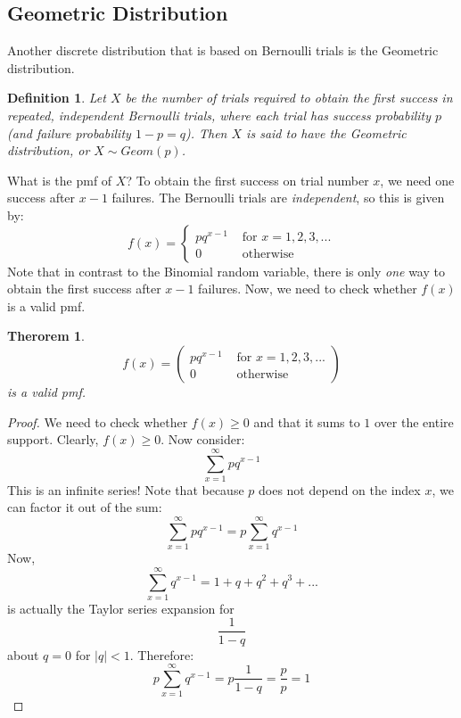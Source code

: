 \documentclass[12pt]{article} %
\newtheorem{defn}{Definition}
\newtheorem{thm}{Therorem}
\begin{document}
\subsection{Geometric Distribution}
Another discrete distribution that is based on Bernoulli trials is the Geometric distribution.
\begin{defn}
Let $X$ be the number of trials required to obtain the first success in repeated, independent Bernoulli trials, where each trial has success probability $p$ (and failure probability $1-p=q$). Then $X$ is said to have the Geometric distribution, or $X\sim Geom(p)$.
\end{defn}
What is the pmf of $X$? To obtain the first success on trial number $x$, we need one success after $x-1$ failures. The Bernoulli trials are \emph{independent}, so this is given by:
$$f(x) = \left\{\begin{matrix}
pq^{x-1} & \textrm{ for } x=1,2,3,...\\
0&\textrm{ otherwise}
\end{matrix}\right.$$
Note that in contrast to the Binomial random variable, there is only \emph{one} way to obtain the first success after $x-1$ failures. Now, we need to check whether $f(x)$ is a valid pmf.
\begin{thm}
$$f(x) = \left(\begin{matrix}
pq^{x-1} & \textrm{ for } x=1,2,3,...\\
0&\textrm{ otherwise}
\end{matrix}\right)$$
is a valid pmf.
\end{thm}
\begin{proof}
We need to check whether $f(x)\geq 0$ and that it sums to $1$ over the entire support. Clearly, $f(x)\geq 0$. Now consider:
$$\sum_{x=1}^\infty p q^{x-1}$$
This is an infinite series! Note that because $p$ does not depend on the index $x$, we can factor it out of the sum:
$$\sum_{x=1}^\infty p q^{x-1} = p\sum_{x=1}^\infty q^{x-1}$$
Now,
$$\sum_{x=1}^\infty q^{x-1} = 1+q+q^2+q^3+...$$
is actually the Taylor series expansion for 
$$\frac1{1-q}$$
about $q=0$ for $|q|<1$. Therefore:
$$p\sum_{x=1}^\infty q^{x-1} = p \frac1{1-q}= \frac{p}{p}=1$$
\end{proof}
\end{document}
